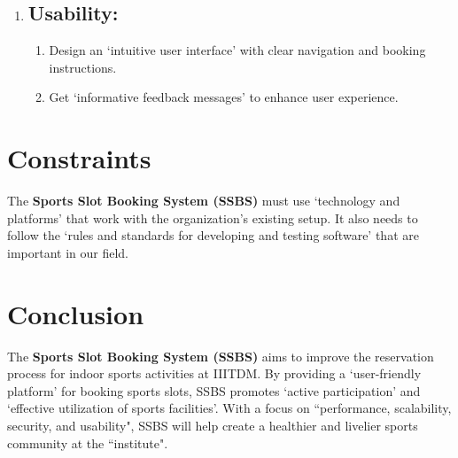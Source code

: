 \documentclass[12pt]{article}
\begin{document}
\begin{enumerate}[label=\arabic*.]
    \vspace{0.4cm}

    \newpage
    
    \item[] \subsection{Usability:}
    \begin{enumerate}[label=\alph*)]
        \item Design an `intuitive user interface' with clear navigation and booking instructions.
        \item Get `informative feedback messages' to enhance user experience.
    \end{enumerate}
   
\end{enumerate}



\section{Constraints}
\hspace{0.8cm} The \textbf{Sports Slot Booking System (SSBS)} must use `technology and platforms' that work with the organization's existing setup. It also needs to follow the `rules and standards for developing and testing software' that are important in our field.

\vspace{0.4cm}

\section{Conclusion}
\hspace{0.8cm} The \textbf{Sports Slot Booking System (SSBS)} aims to improve the reservation process for indoor sports activities at IIITDM. By providing a `user-friendly platform' for booking sports slots, SSBS promotes `active participation' and `effective utilization of sports facilities'. With a focus on ``performance, scalability, security, and usability", SSBS will help create a healthier and livelier sports community at the ``institute".
\end{document}
